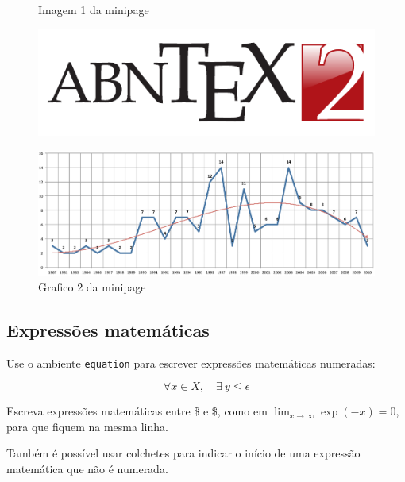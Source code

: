 \begin{figure}[H]
	\label{teste}
	\centering
	\begin{minipage}{0.4\textwidth}
		\centering
		\caption{Imagem 1 da minipage} \label{fig_minipage_imagem1}
		\includegraphics[scale=0.9]{USPSC-img/USPSC-modelo-img-marca.pdf}
	\end{minipage}
	\hfill
	\begin{minipage}{0.4\textwidth}
		\centering
		\caption{Grafico 2 da minipage} \label{fig_minipage_grafico2}
		\includegraphics[scale=0.2]{USPSC-img/USPSC-modelo-img-grafico.pdf}
	\end{minipage}
\end{figure}

\subsection{Expressões matemáticas}

Use o ambiente \texttt{equation} para escrever
expressões matemáticas numeradas:

\begin{equation}
\forall x \in X, \quad \exists \: y \leq \epsilon
\end{equation}

Escreva expressões matemáticas entre \$ e \$, como em $ \lim_{x \to \infty}
\exp(-x) = 0 $, para que fiquem na mesma linha.

Também é possível usar colchetes para indicar o início de uma expressão
matemática que não é numerada.

